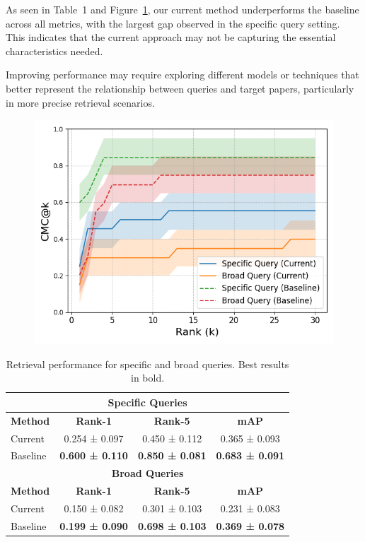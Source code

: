 \documentclass[fleqn,moreauthors,10pt]{ds_report}
\begin{document}
As seen in Table~1 and Figure~\ref{fig:cmc}, our current method underperforms the baseline across all metrics,
with the largest gap observed in the specific query setting.
This indicates that the current approach may not be capturing the essential characteristics needed.

Improving performance may require exploring different models or techniques that better represent
the relationship between queries and target papers, particularly in more precise retrieval scenarios.



\begin{figure}[h]
    \centering
    \includegraphics[width=\columnwidth]{fig/cmc.png}
    \caption{}
    \label{fig:cmc}
\end{figure}

\begin{table}[h]
\centering
\caption{Retrieval performance for specific and broad queries. Best results in bold.}
\begin{tabular}{l|c|c|c}
\toprule
\multicolumn{4}{c}{\textbf{Specific Queries}} \\
\midrule
\textbf{Method} & \textbf{Rank-1} & \textbf{Rank-5} & \textbf{mAP} \\
\midrule
Current  & 0.254 ± 0.097 & 0.450 ± 0.112 & 0.365 ± 0.093 \\
Baseline & \textbf{0.600 ± 0.110} & \textbf{0.850 ± 0.081} & \textbf{0.683 ± 0.091} \\
\midrule[0.8pt]
\multicolumn{4}{c}{\textbf{Broad Queries}} \\
\midrule
\textbf{Method} & \textbf{Rank-1} & \textbf{Rank-5} & \textbf{mAP} \\
\midrule
Current  & 0.150 ± 0.082 & 0.301 ± 0.103 & 0.231 ± 0.083 \\
Baseline & \textbf{0.199 ± 0.090} & \textbf{0.698 ± 0.103} & \textbf{0.369 ± 0.078} \\
\bottomrule
\end{tabular}
\end{table}
\end{document}
